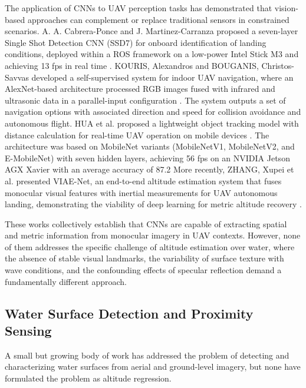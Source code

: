     The application of CNNs to UAV perception tasks has demonstrated that vision-based approaches can complement or replace traditional sensors in constrained scenarios.
    A. A. Cabrera-Ponce and J. Martinez-Carranza proposed a seven-layer Single Shot Detection CNN (SSD7) for onboard identification of landing conditions, deployed within a ROS framework on a low-power Intel Stick M3 and achieving 13 fps in real time \cite{OnboardCNN}.
    KOURIS, Alexandros and BOUGANIS, Christos-Savvas developed a self-supervised system for indoor UAV navigation, where an AlexNet-based architecture processed RGB images fused with infrared and ultrasonic data in a parallel-input configuration \cite{ByMySelf}. The system outputs a set of navigation options with associated direction and speed for collision avoidance and autonomous flight.
    HUA et al. proposed a lightweight object tracking model with distance calculation for real-time UAV operation on mobile devices \cite{MobileNetTracking}.
    The architecture was based on MobileNet variants (MobileNetV1, MobileNetV2, and E-MobileNet) with seven hidden layers, achieving 56 fps on an NVIDIA Jetson AGX Xavier with an average accuracy of 87.2%
    More recently, ZHANG, Xupei et al. presented VIAE-Net, an end-to-end altitude estimation system that fuses monocular visual features with inertial measurements for UAV autonomous landing, demonstrating the viability of deep learning for metric altitude recovery \cite{VIAENetAltitude}.

    These works collectively establish that CNNs are capable of extracting spatial and metric information from monocular imagery in UAV contexts.
    However, none of them addresses the specific challenge of altitude estimation over water, where the absence of stable visual landmarks, the variability of surface texture with wave conditions, and the confounding effects of specular reflection demand a fundamentally different approach.

    \subsection{Water Surface Detection and Proximity Sensing}

    A small but growing body of work has addressed the problem of detecting and characterizing water surfaces from aerial and ground-level imagery, but none have formulated the problem as altitude regression.

